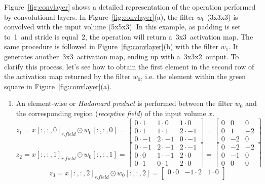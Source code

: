 \begin{description}
	Figure~\ref{fig:convlayer} shows a detailed representation of the operation performed by convolutional layers. In Figure~\ref{fig:convlayer}(a), the filter $w_0$ (3x3x3) is convolved with the input volume (5x5x3). In this example, as padding is set to~1~and stride is equal~2, the operation will return a~3x3~activation map. The same procedure is followed in Figure~\ref{fig:convlayer}(b) with the filter $w_1$. It generates another~3x3~activation map, ending up with a~3x3x2~output. To clarify this process, let's see how to obtain the first element in the second row of the activation map returned by the filter $w_0$, i.e. the element within the green square in Figure~\ref{fig:convlayer}(a).
	\begin{enumerate}
		\item An element-wise or \emph{Hadamard product} is performed between the filter $w_0$ and the corresponding region (\emph{receptive field}) of the input volume $x$.
		\begin{equation}
		z_1=x[:,:,0]_{r. field}\odot{w_0[:,:,0]} = 
		\begin{bmatrix}
		0\cdot 1 & 1\cdot 0 & 1\cdot 0\\
		0\cdot 1 & 1\cdot 1 & 2\cdot -1\\
		0\cdot -1 & 2\cdot -1 & 0\cdot -1
		\end{bmatrix}=
		\begin{bmatrix}
		0 & 0 & 0\\
		0 & 1 & -2\\
		0 & -2 & 0
		\end{bmatrix}
		\end{equation}
		\begin{equation}
		z_2=x[:,:,1]_{r. field}\odot{w_0[:,:,1]} = 
		\begin{bmatrix}
		0\cdot -1 & 2\cdot -1 & 2\cdot -1\\
		0\cdot 0 & 1\cdot -1 & 2\cdot 0\\
		0\cdot 1 & 0\cdot 1 & 2\cdot 0
		\end{bmatrix}=
		\begin{bmatrix}
		0 & -2 & -2\\
		0 & -1 & 0\\
		0 & 0 & 0
		\end{bmatrix}
		\end{equation}
		\begin{equation}
		z_3=x[:,:,2]_{r. field}\odot{w_0[:,:,2]} = 
		\begin{bmatrix}
		0\cdot 0 & -1\cdot 2 & 1\cdot 0\\

\end{bmatrix}
\end{equation}
\end{enumerate}
\end{description}
